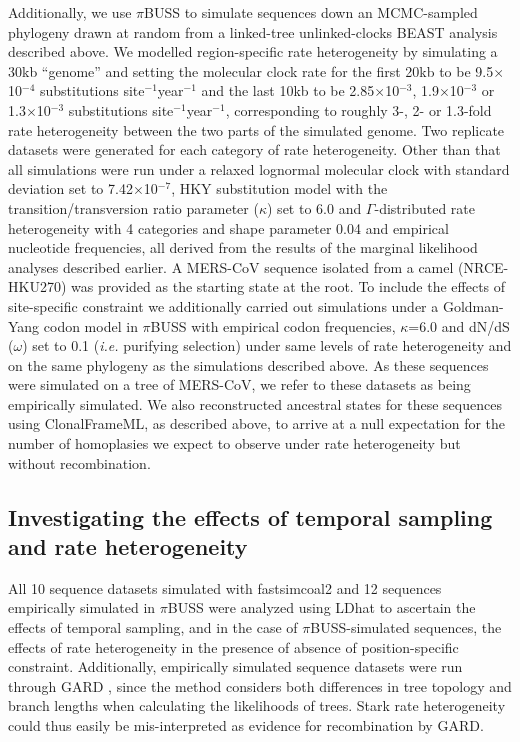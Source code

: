 \documentclass[11pt,oneside,letterpaper]{article}
\begin{document}
Additionally, we use $\pi$BUSS \citep{bielejec_2014} to simulate sequences down an MCMC-sampled phylogeny drawn at random from a linked-tree unlinked-clocks BEAST analysis described above.
We modelled region-specific rate heterogeneity by simulating a 30kb ``genome'' and setting the molecular clock rate for the first 20kb to be 9.5$\times$10$^{-4}$ substitutions site$^{-1}$year$^{-1}$ and the last 10kb to be 2.85$\times$10$^{-3}$, 1.9$\times$10$^{-3}$ or 1.3$\times$10$^{-3}$ substitutions site$^{-1}$year$^{-1}$, corresponding to roughly 3-, 2- or 1.3-fold rate heterogeneity between the two parts of the simulated genome.
Two replicate datasets were generated for each category of rate heterogeneity.
Other than that all simulations were run under a relaxed lognormal molecular clock \citep{drummond_2006} with standard deviation set to 7.42$\times$10$^{-7}$, HKY substitution model \citep{hky_1985} with the transition/transversion ratio parameter ($\kappa$) set to 6.0 and $\Gamma$-distributed rate heterogeneity with 4 categories and shape parameter 0.04 and empirical nucleotide frequencies, all derived from the results of the marginal likelihood analyses described earlier.
A MERS-CoV sequence isolated from a camel (NRCE-HKU270) was provided as the starting state at the root.
To include the effects of site-specific constraint we additionally carried out simulations under a Goldman-Yang codon model \citep{goldman_1994} in $\pi$BUSS with empirical codon frequencies, $\kappa$=6.0 and dN/dS ($\omega$) set to 0.1 (\textit{i.e.} purifying selection) under same levels of rate heterogeneity and on the same phylogeny as the simulations described above.
As these sequences were simulated on a tree of MERS-CoV, we refer to these datasets as being empirically simulated.
We also reconstructed ancestral states for these sequences using ClonalFrameML, as described above, to arrive at a null expectation for the number of homoplasies we expect to observe under rate heterogeneity but without recombination.

\subsection*{Investigating the effects of temporal sampling and rate heterogeneity}
All 10 sequence datasets simulated with fastsimcoal2 and 12 sequences empirically simulated in $\pi$BUSS were analyzed using LDhat \citep{mcvean_2002} to ascertain the effects of temporal sampling, and in the case of $\pi$BUSS-simulated sequences, the effects of rate heterogeneity in the presence of absence of position-specific constraint.
Additionally, empirically simulated sequence datasets were run through GARD \citep{pond_2006}, since the method considers both differences in tree topology and branch lengths when calculating the likelihoods of trees.
Stark rate heterogeneity could thus easily be mis-interpreted as evidence for recombination by GARD.
\end{document}
